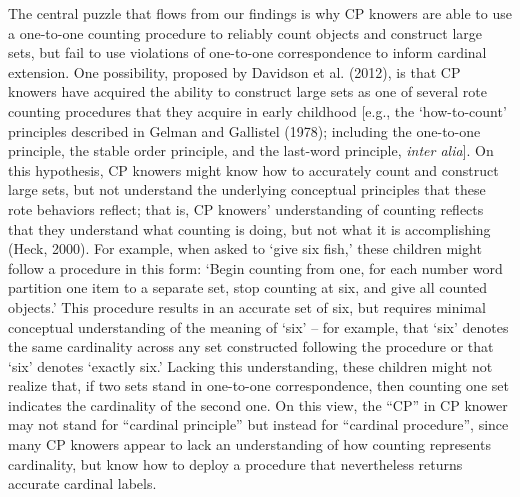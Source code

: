 \documentclass[
  man,floatsintext]{apa7}
\begin{document}
The central puzzle that flows from our findings is why CP knowers are able to use a one-to-one counting procedure to reliably count objects and construct large sets, but fail to use violations of one-to-one correspondence to inform cardinal extension. One possibility, proposed by Davidson et al. (2012), is that CP knowers have acquired the ability to construct large sets as one of several rote counting procedures that they acquire in early childhood {[}e.g., the `how-to-count' principles described in Gelman and Gallistel (1978); including the one-to-one principle, the stable order principle, and the last-word principle, \emph{inter alia}{]}. On this hypothesis, CP knowers might know how to accurately count and construct large sets, but not understand the underlying conceptual principles that these rote behaviors reflect; that is, CP knowers' understanding of counting reflects that they understand what counting is doing, but not what it is accomplishing (Heck, 2000). For example, when asked to `give six fish,' these children might follow a procedure in this form: `Begin counting from one, for each number word partition one item to a separate set, stop counting at six, and give all counted objects.' This procedure results in an accurate set of six, but requires minimal conceptual understanding of the meaning of `six' -- for example, that `six' denotes the same cardinality across any set constructed following the procedure or that `six' denotes `exactly six.' Lacking this understanding, these children might not realize that, if two sets stand in one-to-one correspondence, then counting one set indicates the cardinality of the second one. On this view, the ``CP'' in CP knower may not stand for ``cardinal principle'' but instead for ``cardinal procedure'', since many CP knowers appear to lack an understanding of how counting represents cardinality, but know how to deploy a procedure that nevertheless returns accurate cardinal labels.
\end{document}
